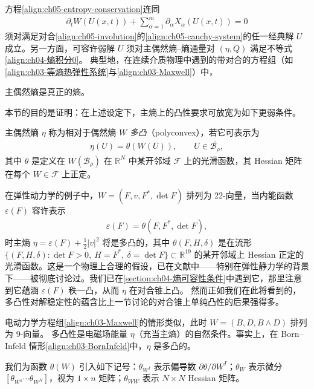 \documentclass[../../main.tex]{subfiles}
\begin{document}
方程\eqref{align:ch05-entropy-conservation}连同
\begin{align}
\partial_{t}W(U(x,t))+\sum_{\alpha=1}^{m}\partial_{\alpha}X_{\alpha}(U(x,t))=0\label{align:ch05-W-conservation}
\end{align}
须对满足对合\eqref{align:ch05-involution}的\eqref{align:ch05-cauchy-system}的任一经典解 $U$ 成立。另一方面，可容许弱解 $U$ 须对主偶然熵--熵通量对 $(\eta,Q)$ 满足不等式\eqref{align:ch04-熵积分0}。
典型地，在连续介质物理中遇到的带对合的方程组（如\eqref{align:ch03-等熵热弹性系统}与\eqref{align:ch03-Maxwell}）中，

主偶然熵是真正的熵。

本节的目的是证明：在上述设定下，主熵上的凸性要求可放宽为如下更弱条件。

\begin{definition}[多凸]\label{definition:ch05-polyconvex}
主偶然熵 $\eta$ 称为相对于偶然熵 $W$ \emph{多凸}（polyconvex），若它可表示为
\begin{align}
\eta(U)=\theta(W(U)),\qquad U\in\overline{\mathscr{B}_{\rho}},\label{align:ch05-polyconvex-def}
\end{align}
其中 $\theta$ 是定义在 $W(\mathscr{B}_{\rho})$ 在 $\mathbb{R}^{N}$ 中某开邻域 $\mathscr{F}$ 上的光滑函数，其 Hessian 矩阵在每个 $W\in\mathscr{F}$ 上正定。
\end{definition}

在弹性动力学的例子中，$W=(F,v,F^{*},\det F)$ 排列为 22-向量，当内能函数 $\varepsilon(F)$ 容许表示
\begin{align}
\varepsilon(F)=\theta(F,F^{*},\det F),\label{align:ch05-elastic-polyconvex}
\end{align}
时主熵 $\eta=\varepsilon(F)+\frac{1}{2}|v|^{2}$ 将是多凸的，其中 $\theta(F,H,\delta)$ 是在流形 $\{(F,H,\delta):\det F>0,\ H=F^{*},\ \delta=\det F\}\subset\mathbb{R}^{19}$ 的某开邻域上 Hessian 正定的光滑函数。这是一个物理上合理的假设，已在文献中——特别在弹性静力学的背景下——被彻底讨论过。我们已在\cref{section:ch04-熵可容性条件}中遇到它，那里注意到它蕴涵 $\varepsilon(F)$ 秩一凸，从而 $\eta$ 在对合锥上凸。
然而正如我们在此将看到的，多凸性对解稳定性的蕴含比上一节讨论的对合锥上单纯凸性的后果强得多。

电动力学方程组\eqref{align:ch03-Maxwell}的情形类似，此时 $W=(B,D,B\wedge D)$ 排列为 9-向量。
多凸性是电磁场能量 $\eta$（充当主熵）的自然条件。事实上，在 Born--Infeld 情形\eqref{align:ch03-BornInfeld}中，$\eta$ 是多凸的。

我们为函数 $\theta(W)$ 引入如下记号：$\theta_{W^{I}}$ 表示偏导数 $\partial\theta/\partial W^{I}$；$\theta_{W}$ 表示微分 $[\theta_{W^{1}}\cdots\theta_{W^{N}}]$，视为 $1\times n$ 矩阵；$\theta_{WW}$ 表示 $N\times N$ Hessian 矩阵。
\end{document}

